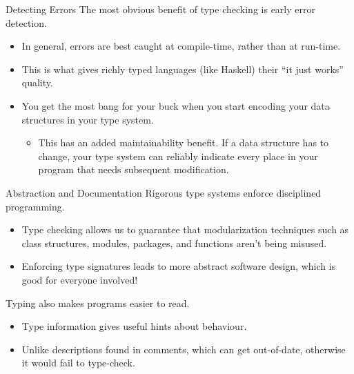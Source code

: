 \documentclass[11pt]{beamer}
\begin{document}
\begin{frame}{Detecting Errors}
The most obvious benefit of type checking is early error detection.
\begin{itemize}
\item In general, errors are best caught at compile-time, rather than at run-time.
\item This is what gives richly typed languages (like Haskell) their ``it just works'' quality.  
\item You get the most bang for your buck when you start encoding your data structures in your type system.  
\begin{itemize}
\item This has an added maintainability benefit.  If a data structure has to change, your type system can reliably indicate every place in your program that needs subsequent modification.  
\end{itemize}
\end{itemize}
\end{frame}

\begin{frame}[fragile=singleslide]{Abstraction and Documentation}
Rigorous type systems enforce disciplined programming.  
\begin{itemize}
\item Type checking allows us to guarantee that modularization techniques such as class structures, modules, packages, and functions aren't being misused.  
\item Enforcing type signatures leads to more abstract software design, which is good for everyone involved! 
\end{itemize}
Typing also makes programs easier to read.
\begin{itemize}
\item Type information gives useful hints about behaviour.  
\item Unlike descriptions found in comments, which can get out-of-date, otherwise it would fail to type-check. 
\end{itemize}
\end{frame}
\end{document}
